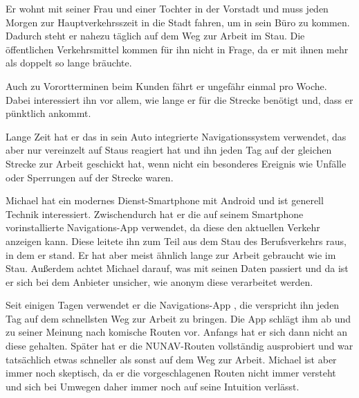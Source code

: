 Er wohnt mit seiner Frau und einer Tochter in der Vorstadt und muss jeden Morgen zur Hauptverkehrsszeit in die Stadt fahren, um in sein Büro zu kommen. Dadurch steht er nahezu täglich auf dem Weg zur Arbeit im Stau. Die öffentlichen Verkehrsmittel kommen für ihn nicht in Frage, da er mit ihnen mehr als doppelt so lange bräuchte.

Auch zu Vorortterminen beim Kunden fährt er ungefähr einmal pro Woche. Dabei interessiert ihn vor allem, wie lange er für die Strecke benötigt und, dass er pünktlich ankommt.

Lange Zeit hat er das in sein Auto integrierte Navigationssystem verwendet, das aber nur vereinzelt auf Staus reagiert hat und ihn jeden Tag auf der gleichen Strecke zur Arbeit geschickt hat, wenn nicht ein besonderes Ereignis wie Unfälle oder Sperrungen auf der Strecke waren.

Michael hat ein modernes Dienst-Smartphone mit Android und ist generell Technik interessiert. Zwischendurch hat er die auf seinem Smartphone vorinstallierte Navigations-App verwendet, da diese den aktuellen Verkehr anzeigen kann. Diese leitete ihn zum Teil aus dem Stau des Berufsverkehrs raus, in dem er stand. Er hat aber meist ähnlich lange zur Arbeit gebraucht wie im Stau. Außerdem achtet Michael darauf, was mit seinen Daten passiert und da ist er sich bei dem Anbieter unsicher, wie anonym diese verarbeitet werden.

Seit einigen Tagen verwendet er die Navigations-App , die verspricht ihn jeden Tag auf dem schnellsten Weg zur Arbeit zu bringen. Die App schlägt ihm ab und zu seiner Meinung nach \glqq komische\grqq{} Routen vor. Anfangs hat er sich dann nicht an diese gehalten. Später hat er die NUNAV-Routen vollständig ausprobiert und war tatsächlich etwas schneller als sonst auf dem Weg zur Arbeit. Michael ist aber immer noch skeptisch, da er die vorgeschlagenen Routen nicht immer versteht und sich bei Umwegen daher immer noch auf seine Intuition verlässt.

\newpage